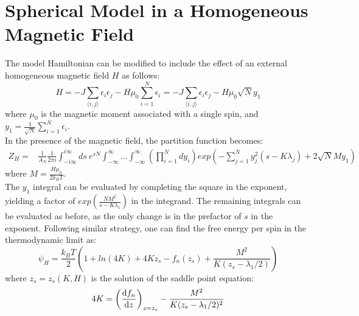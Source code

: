 \documentclass{article}
\begin{document}
\section{Spherical Model in a Homogeneous Magnetic Field}
The model Hamiltonian can be modified to include the effect of an external homogeneous magnetic field $H$ as follows:
\begin{equation}
    H = -J \sum_{\langle i,j \rangle} \epsilon_i \epsilon_j - H \mu_0 \sum_{i=1}^{N} \epsilon_i = -J \sum_{\langle i,j \rangle} \epsilon_i \epsilon_j - H \mu_0 \sqrt{N} y_1
\end{equation}
where $\mu_0$ is the magnetic moment associated with a single spin, and $y_1 = \frac{1}{\sqrt{N}} \sum_{i=1}^{N} \epsilon_i$. \\
In the presence of the magnetic field, the partition function becomes:
\begin{align}
    Z_H = & \frac{1}{A_N} \frac{1}{2 \pi i} \int_{-i \infty}^{i \infty} ds \ e^{s N} \int_{-\infty}^{\infty} \ldots \int_{-\infty}^{\infty} \left( \prod_{i=1}^{N} dy_i \right) exp \left( -\sum_{j=1}^{N} y_j^2 (s - K \lambda_j) + 2 \sqrt{N} M y_1 \right)
\end{align}
where $M = \frac{H \mu_0}{2 k_B T}$. \\
The $y_1$ integral can be evaluated by completing the square in the exponent, yielding a factor of $exp \left( \frac{N M^2}{s - K \lambda_1} \right)$ in the integrand. The remaining integrals can be evaluated as before, as the only change is in the prefactor of $s$ in the exponent. 
Following similar strategy, one can find the free energy per spin in the thermodynamic limit as:
\begin{equation}
    \psi_H = \frac{k_B T}{2} \left( 1 + ln(4 K) + 4 K z_s - f_n(z_s) + \frac{M^2}{K(z_s- \lambda_1/2)} \right)
\end{equation}
where $z_s = z_s(K,H)$ is the solution of the saddle point equation:
\begin{equation}
    4K = \left( \dv{f_n}{z} \right)_{z=z_s} - \frac{M^2}{K (z_s- \lambda_1/2)^2}
\end{equation}

 

\nocite{*}
\end{document}
